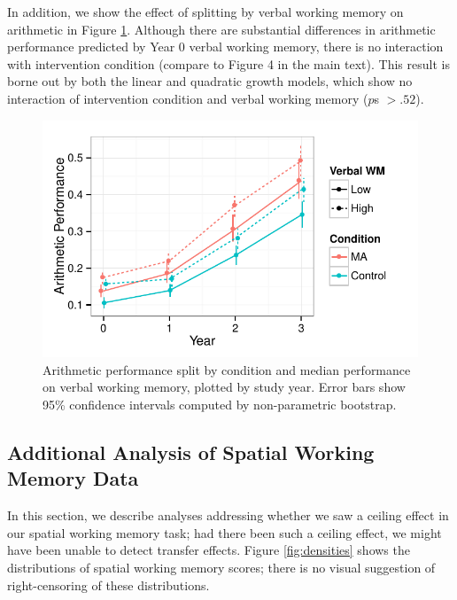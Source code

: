 \documentclass[11pt]{article}
\begin{document}
In addition, we show the effect of splitting by verbal working memory on arithmetic in Figure \ref{fig:arithvwm}. Although there are substantial differences in arithmetic performance predicted by Year 0 verbal working memory, there is no interaction with intervention condition (compare to Figure 4 in the main text). This result is borne out by both the linear and quadratic growth models, which show no interaction of intervention condition and verbal working memory ($p$s $> .52$).

\begin{figure}[H]
\begin{center}
\includegraphics[width=4.5in]{figures/arith_by_vwm.pdf}
\end{center}
\caption{Arithmetic performance split by condition and median performance on verbal working memory, plotted by study year. Error bars show 95\% confidence intervals computed by non-parametric bootstrap.}
\label{fig:arithvwm}
\end{figure}

\subsection{Additional Analysis of Spatial Working Memory Data}

In this section, we describe analyses addressing whether we saw a ceiling effect in our spatial working memory task; had there been such a ceiling effect, we might have been unable to detect transfer effects. Figure \ref{fig:densities} shows the distributions of spatial working memory scores; there is no visual suggestion of right-censoring of these distributions. 
\end{document}

